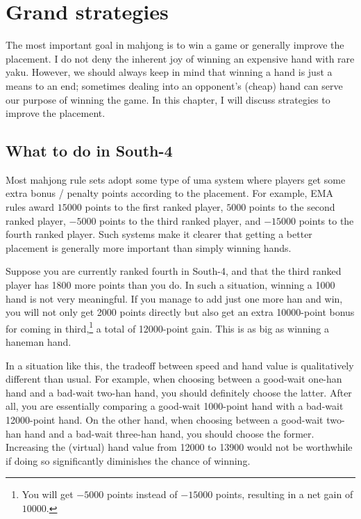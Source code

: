 
\chapter{Grand strategies} \label{ch:grand}
\thispagestyle{empty}
The most important goal in mahjong is to win a game or generally improve the placement. I do not deny the inherent joy of winning an expensive hand with rare {\jap yaku}. However, we should always keep in mind that winning a hand is just a means to an end; sometimes dealing into an opponent's (cheap) hand can serve our purpose of winning the game. 
In this chapter, I will discuss strategies to improve the placement.

\section{What to do in South-4}
Most mahjong rule sets adopt some type of {\jap uma} system where players get some extra bonus / penalty points according to the placement. For example, EMA rules award $15000$ points to the first ranked player, $5000$ points to the second ranked player, $-5000$ points to the third ranked player, and $-15000$ points to the fourth ranked player. 
Such systems make it clearer that getting a better placement is generally more important than simply winning hands. 

\bigskip
Suppose you are currently ranked fourth in South-4, and that the third ranked player has 1800 more points than you do. In such a situation, winning a 1000 hand is not very meaningful. If you manage to add just one more {\jap han} and win, you will not only get 2000 points directly but also get an extra 10000-point bonus for coming in third,\footnote{You will get $-5000$ points instead of $-15000$ points, resulting in a net gain of $10000$.} a total of 12000-point gain. This is as big as winning a {\jap haneman} hand. 

\bigskip
In a situation like this, the tradeoff between speed and hand value is qualitatively different than usual. For example, when choosing between a good-wait one-{\jap han} hand and a bad-wait two-{\jap han} hand, you should definitely choose the latter. After all, you are essentially comparing a good-wait 1000-point hand with a bad-wait 12000-point hand. On the other hand, when choosing between a good-wait two-{\jap han} hand and a bad-wait three-{\jap han} hand, you should choose the former. Increasing the (virtual) hand value from 12000 to 13900 would not be worthwhile if doing so significantly diminishes the chance of winning. 

